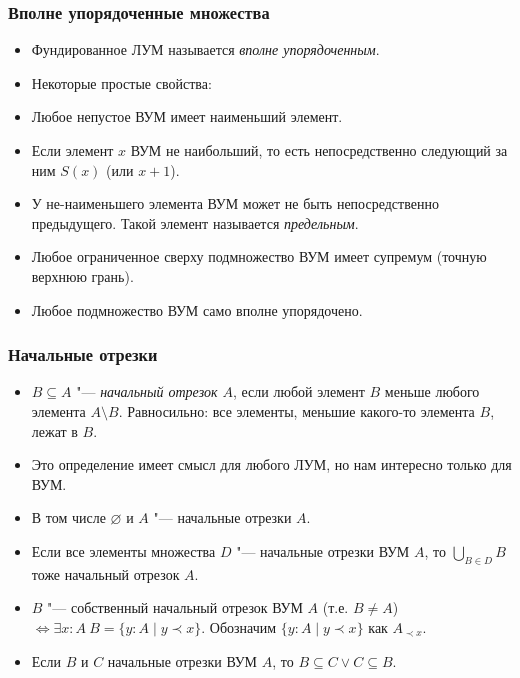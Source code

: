 \documentclass[10pt]{beamer}
\begin{document}
\begin{frame}
    \frametitle{Вполне упорядоченные множества}
    \begin{itemize}
        \item Фундированное ЛУМ называется \emph{вполне упорядоченным}.
        \item Некоторые простые свойства:
        \item Любое непустое ВУМ имеет наименьший элемент.
        \item Если элемент $x$ ВУМ не наибольший, то есть непосредственно следующий за ним $S(x)$ (или $x+1$).
        \item У не-наименьшего элемента ВУМ может не быть непосредственно предыдущего. Такой элемент называется \emph{предельным}.
        \item Любое ограниченное сверху подмножество ВУМ имеет супремум (точную верхнюю грань).
        \item Любое подмножество ВУМ само вполне упорядочено.
    \end{itemize}
\end{frame}

\begin{frame}
    \frametitle{Начальные отрезки}
    \begin{itemize}
        \item $B \subseteq A$ "--- \emph{начальный отрезок $A$}, если любой элемент $B$ меньше любого элемента $A \setminus B$. Равносильно: все элементы, меньшие какого-то элемента $B$, лежат в $B$.
        \item Это определение имеет смысл для любого ЛУМ, но нам интересно только для ВУМ.
        \item В том числе $\varnothing$ и $A$ "--- начальные отрезки $A$. 
        \item Если все элементы множества $D$ "--- начальные отрезки ВУМ $A$, то $\bigcup_{B\in D}B$ тоже начальный отрезок $A$.
        \item $B$ "--- собственный начальный отрезок ВУМ $A$ (т.е. $B \neq A$) $\Leftrightarrow \exists x:A ~ B = \{y:A \mid y \prec x\}$. Обозначим $\{y:A \mid y \prec x\}$ как $A_{\prec x}$.
        \item Если $B$ и $C$ начальные отрезки ВУМ $A$, то $B \subseteq C \lor C \subseteq B$.
    \end{itemize}
\end{frame}
\end{document}
